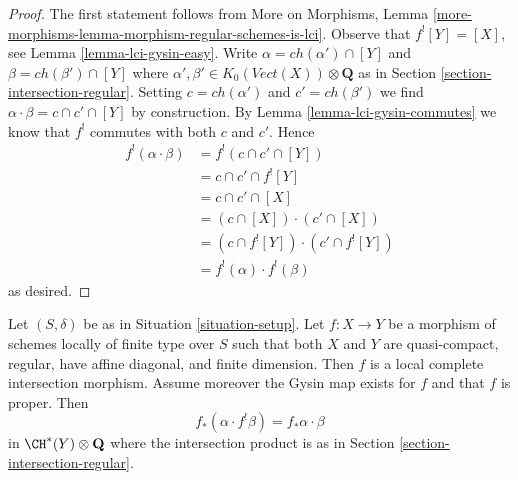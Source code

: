 \begin{proof}
The first statement follows from
More on Morphisms, Lemma
\ref{more-morphisms-lemma-morphism-regular-schemes-is-lci}.
Observe that $f^![Y] = [X]$, see Lemma \ref{lemma-lci-gysin-easy}.
Write $\alpha = ch(\alpha') \cap [Y]$ and $\beta = ch(\beta') \cap [Y]$
where $\alpha', \beta' \in K_0(\textit{Vect}(X)) \otimes \mathbf{Q}$
as in Section \ref{section-intersection-regular}.
Setting $c = ch(\alpha')$ and $c' = ch(\beta')$ we find
$\alpha \cdot \beta = c \cap c' \cap [Y]$ by construction.
By Lemma \ref{lemma-lci-gysin-commutes} we know that $f^!$
commutes with both $c$ and $c'$. Hence
\begin{align*}
f^!(\alpha \cdot \beta)
& =
f^!(c \cap c' \cap [Y]) \\
& =
c \cap c' \cap f^![Y] \\
& =
c \cap c' \cap [X] \\
& =
(c \cap [X]) \cdot (c' \cap [X]) \\
& =
(c \cap f^![Y]) \cdot (c' \cap f^![Y]) \\
& =
f^!(\alpha) \cdot f^!(\beta)
\end{align*}
as desired.
\end{proof}

\begin{lemma}
\label{lemma-projection-formula-regular}
Let $(S, \delta)$ be as in Situation \ref{situation-setup}.
Let $f : X \to Y$ be a morphism of schemes locally of finite
type over $S$ such that both $X$ and $Y$ are quasi-compact,
regular, have affine diagonal, and finite dimension.
Then $f$ is a local complete intersection morphism.
Assume moreover the Gysin map exists for $f$
and that $f$ is proper. Then
$$
f_*(\alpha \cdot f^!\beta) = f_*\alpha \cdot \beta
$$
in $\CH^*(Y) \otimes \mathbf{Q}$ where the intersection product
is as in Section \ref{section-intersection-regular}.
\end{lemma}

